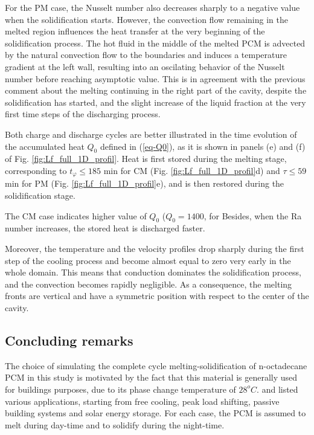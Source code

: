 For the PM case, the Nusselt number also decreases sharply to a negative value when the solidification starts.
However, the convection flow remaining in the melted region influences the heat transfer at the very beginning of the solidification process.
The hot fluid in the middle of the melted PCM is advected by the natural convection flow to the boundaries and induces a temperature gradient at the left wall, resulting into an oscilating behavior of the Nusselt number before reaching asymptotic value.
This is in agreement with the previous comment about the melting continuing in the right part of the cavity, despite the solidification has started, and the slight increase of the liquid fraction at the very first time steps of the discharging process.


Both charge and  discharge cycles are better illustrated in the time evolution of the accumulated heat $Q_0$ defined in (\ref{eq-Q0}), as it is shown in panels (e) and (f) of Fig.  \ref{fig:Lf_full_1D_profil}.
Heat is first stored during the melting stage, corresponding to $t_{\varphi} \leq 185$ min for CM (Fig. \ref{fig:Lf_full_1D_profil}d) and $\tau \leq 59$ min for PM (Fig. \ref{fig:Lf_full_1D_profil}e), and is then restored during the solidification stage.

\noindent The CM case indicates higher value of $Q_0$ ($Q_0 = 1400$, for  
Besides, when the Ra number increases, the stored heat is discharged faster.

\noindent Moreover, the temperature and the velocity profiles drop sharply during the first step of the cooling process and become almost equal to zero very early in the whole domain.
This means that conduction dominates the solidification process, and the convection becomes rapidly negligible.
As a consequence, the melting fronts are vertical and have a symmetric position with respect to the center of the cavity. \\


\subsection{Concluding remarks}
The choice of simulating the complete cycle melting-solidification of n-octadecane PCM in this study is motivated by the fact that this material is generally used for buildings purposes, due to its phase change temperature of  $28^{o}C$.
\cite{zhu2009dynamic} and \cite{kalnaes2015phase} listed various applications, starting from free cooling, peak load shifting, passive building systems and solar energy storage.
For each case, the PCM is assumed to melt during day-time and to solidify during the night-time.

